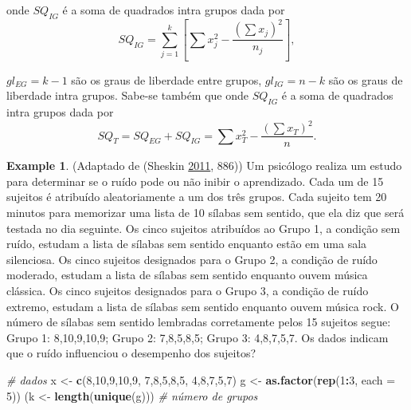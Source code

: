 \documentclass[
]{book}
\newenvironment{Shaded}{\begin{snugshade}}{\end{snugshade}}
\newcommand{\CommentTok}[1]{\textcolor[rgb]{0.56,0.35,0.01}{\textit{#1}}}
\newcommand{\DataTypeTok}[1]{\textcolor[rgb]{0.13,0.29,0.53}{#1}}
\newcommand{\DecValTok}[1]{\textcolor[rgb]{0.00,0.00,0.81}{#1}}
\newcommand{\KeywordTok}[1]{\textcolor[rgb]{0.13,0.29,0.53}{\textbf{#1}}}
\newcommand{\NormalTok}[1]{#1}
\newcommand{\OperatorTok}[1]{\textcolor[rgb]{0.81,0.36,0.00}{\textbf{#1}}}
\newcommand{\StringTok}[1]{\textcolor[rgb]{0.31,0.60,0.02}{#1}}
\theoremstyle{definition}
\theoremstyle{definition}
\newtheorem{example}{Example}[chapter]
\theoremstyle{definition}
\theoremstyle{remark}
\begin{document}
onde \(SQ_{IG}\) é a soma de quadrados intra grupos dada por
\begin{equation}
SQ_{IG} = \sum_{j=1}^k \left[ \sum x_{j}^2 - \frac{(\sum x_j)^2}{n_j} \right],
\label{eq:sq-intra}
\end{equation}

\(gl_{EG}=k-1\) são os graus de liberdade entre grupos, \(gl_{IG}=n-k\) são os graus de liberdade intra grupos. Sabe-se também que
onde \(SQ_{IG}\) é a soma de quadrados intra grupos dada por
\begin{equation}
SQ_{T} = SQ_{EG} + SQ_{IG} = \sum x_{T}^2 - \frac{(\sum x_T)^2}{n}.
\label{eq:sq-t}
\end{equation}

\begin{example}
\protect\hypertarget{exm:anova-entre-suj}{}{\label{exm:anova-entre-suj} }(Adaptado de (Sheskin \protect\hyperlink{ref-sheskin2011handbook}{2011}, 886)) Um psicólogo realiza um estudo para determinar se o ruído pode ou não inibir o aprendizado. Cada um de 15 sujeitos é atribuído aleatoriamente a um dos três grupos. Cada sujeito tem 20 minutos para memorizar uma lista de 10 sílabas sem sentido, que ela diz que será testada no dia seguinte. Os cinco sujeitos atribuídos ao Grupo 1, a condição sem ruído, estudam a lista de sílabas sem sentido enquanto estão em uma sala silenciosa. Os cinco sujeitos designados para o Grupo 2, a condição de ruído moderado, estudam a lista de sílabas sem sentido enquanto ouvem música clássica. Os cinco sujeitos designados para o Grupo 3, a condição de ruído extremo, estudam a lista de sílabas sem sentido enquanto ouvem música rock. O número de sílabas sem sentido lembradas corretamente pelos 15 sujeitos segue: Grupo 1: 8,10,9,10,9; Grupo 2: 7,8,5,8,5; Grupo 3: 4,8,7,5,7. Os dados indicam que o ruído influenciou o desempenho dos sujeitos?
\end{example}

\begin{Shaded}
\begin{Highlighting}[]
\CommentTok{\# dados}
\NormalTok{x \textless{}{-}}\StringTok{ }\KeywordTok{c}\NormalTok{(}\DecValTok{8}\NormalTok{,}\DecValTok{10}\NormalTok{,}\DecValTok{9}\NormalTok{,}\DecValTok{10}\NormalTok{,}\DecValTok{9}\NormalTok{, }\DecValTok{7}\NormalTok{,}\DecValTok{8}\NormalTok{,}\DecValTok{5}\NormalTok{,}\DecValTok{8}\NormalTok{,}\DecValTok{5}\NormalTok{, }\DecValTok{4}\NormalTok{,}\DecValTok{8}\NormalTok{,}\DecValTok{7}\NormalTok{,}\DecValTok{5}\NormalTok{,}\DecValTok{7}\NormalTok{)}
\NormalTok{g \textless{}{-}}\StringTok{ }\KeywordTok{as.factor}\NormalTok{(}\KeywordTok{rep}\NormalTok{(}\DecValTok{1}\OperatorTok{:}\DecValTok{3}\NormalTok{, }\DataTypeTok{each =} \DecValTok{5}\NormalTok{))}
\NormalTok{(k \textless{}{-}}\StringTok{ }\KeywordTok{length}\NormalTok{(}\KeywordTok{unique}\NormalTok{(g))) }\CommentTok{\# número de grupos}
\end{Highlighting}
\end{Shaded}
\end{document}
